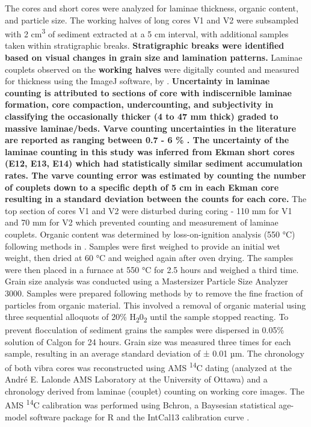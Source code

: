 \documentclass[Royal,times,doublespace,sageh]{sagej}
\begin{document}
The cores and short cores were analyzed for laminae thickness, organic
content, and particle size. The working halves of long cores V1 and V2
were subsampled with 2 cm\textsuperscript{3} of sediment extracted at a
5 cm interval, with additional samples taken within stratigraphic
breaks. \textbf{Stratigraphic breaks were identified based on visual
changes in grain size and lamination patterns.} Laminae couplets
observed on the \textbf{working halves} were digitally counted and
measured for thickness using the ImageJ software, by
\citet{Schneider2012}. \textbf{Uncertainty in laminae counting is
attributed to sections of core with indiscernible laminae formation,
core compaction, undercounting, and subjectivity in classifying the
occasionally thicker (4 to 47 mm thick) graded to massive laminae/beds.
Varve counting uncertainties in the literature are reported as ranging
between 0.7 - 6 \% \citep{Menounos2008c, Zolitschka1991}. The
uncertainty of the laminae counting in this study was inferred from
Ekman short cores (E12, E13, E14) which had statistically similar
sediment accumulation rates. The varve counting error was estimated by
counting the number of couplets down to a specific depth of 5 cm in each
Ekman core resulting in a standard deviation between the counts for each
core.} The top section of cores V1 and V2 were disturbed during coring -
110 mm for V1 and 70 mm for V2 which prevented counting and measurement
of laminae couplets. Organic content was determined by loss-on-ignition
analysis (550 °C) following methods in \citet{Smith2003}. Samples were
first weighed to provide an initial wet weight, then dried at 60 °C and
weighed again after oven drying. The samples were then placed in a
furnace at 550 °C for 2.5 hours and weighed a third time. Grain size
analysis was conducted using a Mastersizer Particle Size Analyzer 3000.
Samples were prepared following methods by \citet{Gray2010} to remove
the fine fraction of particles from organic material. This involved a
removal of organic material using three sequential alloquots of 20\%
H\textsubscript{2}0\textsubscript{2} until the sample stopped reacting.
To prevent flocculation of sediment grains the samples were dispersed in
0.05\% solution of Calgon for 24 hours. Grain size was measured three
times for each sample, resulting in an average standard deviation of ±
0.01 µm. The chronology of both vibra cores was reconstructed using AMS
\textsuperscript{14}C dating (analyzed at the André E. Lalonde AMS
Laboratory at the University of Ottawa) and a chronology derived from
laminae (couplet) counting on working core images. The AMS
\textsuperscript{14}C calibration was performed using Bchron, a
Baysesian statistical age-model software package for R
\citep{Parnell2008, Parnell2011, Haslett2008} and the IntCal13
calibration curve \citep{Reimer2013}.
\end{document}
